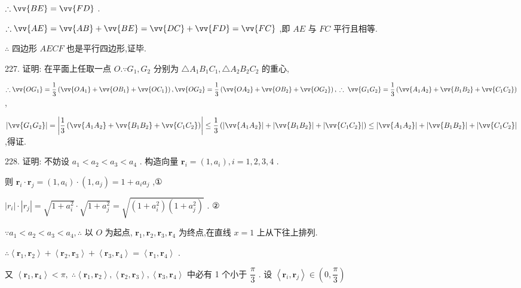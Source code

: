 $\therefore \vv{BE} = \vv{FD}$ .

$\therefore \vv{AE} = \vv{AB} + \vv{BE} = \vv{DC} + \vv{FD} = \vv{FC}$ ,即 ${AE}$ 与 ${FC}$ 平行且相等.

$\therefore$ 四边形 ${AECF}$ 也是平行四边形,证毕.

227. 证明: 在平面上任取一点 $O.\because {G}_{1},{G}_{2}$ 分别为 $\bigtriangleup {A}_{1}{B}_{1}{C}_{1},\bigtriangleup {A}_{2}{B}_{2}{C}_{2}$ 的重心,

$\therefore \vv{O{G}_{1}} = \dfrac{1}{3}\left( {\vv{O{A}_{1}} + \vv{O{B}_{1}} + \vv{O{C}_{1}}}\right) ,\vv{O{G}_{2}} = \dfrac{1}{3}\left( {\vv{O{A}_{2}} + \vv{O{B}_{2}} + \vv{O{G}_{2}}}\right) ,\;\therefore \;\vv{{G}_{1}{G}_{2}} = \dfrac{1}{3}\left( {\vv{{A}_{1}{A}_{2}} + \vv{{B}_{1}{B}_{2}} + \vv{{C}_{1}{C}_{2}}}\right)$ ,

$\left| \vv{{G}_{1}{G}_{2}}\right|  = \left| {\dfrac{1}{3}\left( {\vv{{A}_{1}{A}_{2}} + \vv{{B}_{1}{B}_{2}} + \vv{{C}_{1}{C}_{2}}}\right) }\right|  \leq  \dfrac{1}{3}\left( {\left| \vv{{A}_{1}{A}_{2}}\right|  + \left| \vv{{B}_{1}{B}_{2}}\right|  + \left| \vv{{C}_{1}{C}_{2}}\right| }\right)  \leq  \left| \vv{{A}_{1}{A}_{2}}\right|  + \left| \vv{{B}_{1}{B}_{2}}\right|  + \left| \vv{{C}_{1}{C}_{2}}\right|$ ,得证.

228. 证明: 不妨设 ${a}_{1} < {a}_{2} < {a}_{3} < {a}_{4}$ . 构造向量 ${\mathbf{r}}_{i} = \left( {1,{a}_{i}}\right) ,i = 1,2,3,4$ .

则 ${\mathbf{r}}_{i} \cdot  {\mathbf{r}}_{j} = \left( {1,{a}_{i}}\right)  \cdot  \left( {1,{a}_{j}}\right)  = 1 + {a}_{i}{a}_{j}$ ,①

$\left| {r}_{i}\right|  \cdot  \left| {r}_{j}\right|  = \sqrt{1 + {a}_{i}^{2}} \cdot  \sqrt{1 + {a}_{j}^{2}} = \sqrt{\left( {1 + {a}_{i}^{2}}\right) \left( {1 + {a}_{j}^{2}}\right) }$ . ②

$\because {a}_{1} < {a}_{2} < {a}_{3} < {a}_{4},\therefore$ 以 $O$ 为起点, ${\mathbf{r}}_{1},{\mathbf{r}}_{2},{\mathbf{r}}_{3},{\mathbf{r}}_{4}$ 为终点,在直线 $x = 1$ 上从下往上排列.

$\therefore \left\langle  {{\mathbf{r}}_{1},{\mathbf{r}}_{2}}\right\rangle   + \left\langle  {{\mathbf{r}}_{2},{\mathbf{r}}_{3}}\right\rangle   + \left\langle  {{\mathbf{r}}_{3},{\mathbf{r}}_{4}}\right\rangle   = \left\langle  {{\mathbf{r}}_{1},{\mathbf{r}}_{4}}\right\rangle$ .

又 $\left\langle  {{\mathbf{r}}_{1},{\mathbf{r}}_{4}}\right\rangle   < \pi ,\;\therefore \left\langle  {{\mathbf{r}}_{1},{\mathbf{r}}_{2}}\right\rangle  ,\left\langle  {{\mathbf{r}}_{2},{\mathbf{r}}_{3}}\right\rangle  ,\left\langle  {{\mathbf{r}}_{3},{\mathbf{r}}_{4}}\right\rangle$ 中必有 1 个小于 $\dfrac{\pi }{3}$ . 设 $\left\langle  {{\mathbf{r}}_{i},{\mathbf{r}}_{j}}\right\rangle   \in  \left( {0,\dfrac{\pi }{3}}\right)$

